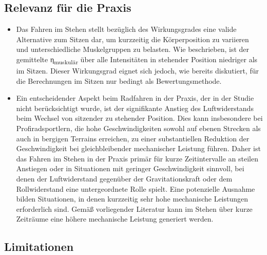 \documentclass[
  letterpaper,
  DIV=11]{scrartcl}
\begin{document}
\subsection{Relevanz für die Praxis}\label{relevanz-fuxfcr-die-praxis}

\begin{itemize}
\item
  Das Fahren im Stehen stellt bezüglich des Wirkungsgrades eine valide
  Alternative zum Sitzen dar, um kurzzeitig die Körperposition zu
  variieren und unterschiedliche Muskelgruppen zu belasten. Wie
  beschrieben, ist der gemittelte η\textsubscript{muskulär} über alle
  Intensitäten in stehender Position niedriger als im Sitzen. Dieser
  Wirkungsgrad eignet sich jedoch, wie bereits diskutiert, für die
  Berechnungen im Sitzen nur bedingt als Bewertungsmethode.
\item
  Ein entscheidender Aspekt beim Radfahren in der Praxis, der in der
  Studie nicht berücksichtigt wurde, ist der signifikante Anstieg des
  Luftwiderstands beim Wechsel von sitzender zu stehender Position. Dies
  kann insbesondere bei Profiradsportlern, die hohe Geschwindigkeiten
  sowohl auf ebenen Strecken als auch in bergigen Terrains erreichen, zu
  einer substantiellen Reduktion der Geschwindigkeit bei
  gleichbleibender mechanischer Leistung führen. Daher ist das Fahren im
  Stehen in der Praxis primär für kurze Zeitintervalle an steilen
  Anstiegen oder in Situationen mit geringer Geschwindigkeit sinnvoll,
  bei denen der Luftwiderstand gegenüber der Gravitationskraft oder dem
  Rollwiderstand eine untergeordnete Rolle spielt. Eine potenzielle
  Ausnahme bilden Situationen, in denen kurzzeitig sehr hohe mechanische
  Leistungen erforderlich sind. Gemäß vorliegender Literatur kann im
  Stehen über kurze Zeiträume eine höhere mechanische Leistung generiert
  werden.
\end{itemize}

\subsection{Limitationen}\label{limitationen}
\end{document}
